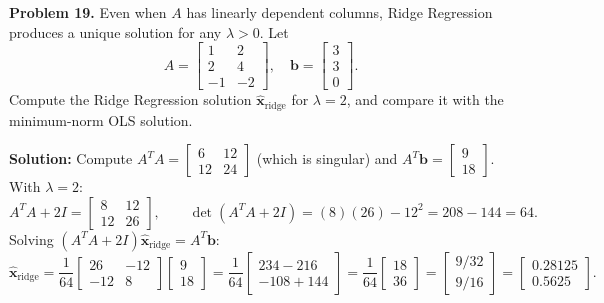\documentclass[11pt, letterpaper]{article}
\theoremstyle{definition}
\theoremstyle{remark}
\begin{document}
\textbf{Problem 19.} Even when $A$ has linearly dependent columns, Ridge Regression produces a unique solution for any $\lambda > 0$. Let
\[
A = \begin{bmatrix} 1 & 2 \\ 2 & 4 \\ -1 & -2 \end{bmatrix}, \quad \mathbf{b} = \begin{bmatrix} 3 \\ 3 \\ 0 \end{bmatrix}.
\]
Compute the Ridge Regression solution $\hat{\mathbf{x}}_{\text{ridge}}$ for $\lambda = 2$, and compare it with the minimum-norm OLS solution.

\textbf{Solution:} Compute $A^T A = \begin{bmatrix} 6 & 12 \\ 12 & 24 \end{bmatrix}$ (which is singular) and $A^T \mathbf{b} = \begin{bmatrix} 9 \\ 18 \end{bmatrix}$. With $\lambda = 2$:
\[
A^T A + 2I = \begin{bmatrix} 8 & 12 \\ 12 & 26 \end{bmatrix}, \qquad \det(A^T A + 2I) = (8)(26) - 12^2 = 208 - 144 = 64.
\]
Solving $(A^T A + 2I)\hat{\mathbf{x}}_{\text{ridge}} = A^T \mathbf{b}$:
\[
\hat{\mathbf{x}}_{\text{ridge}} = \frac{1}{64} \begin{bmatrix} 26 & -12 \\ -12 & 8 \end{bmatrix} \begin{bmatrix} 9 \\ 18 \end{bmatrix} = \frac{1}{64} \begin{bmatrix} 234 - 216 \\ -108 + 144 \end{bmatrix} = \frac{1}{64} \begin{bmatrix} 18 \\ 36 \end{bmatrix} = \begin{bmatrix} 9/32 \\ 9/16 \end{bmatrix} = \begin{bmatrix} 0.28125 \\ 0.5625 \end{bmatrix}.
\]
\end{document}
